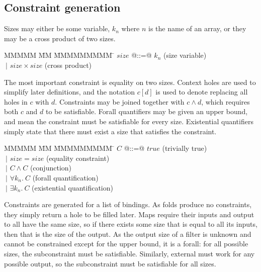 \newcommand{\constr}[1]{\llbracket #1 \rrbracket}
\newcommand{\hole}[0]{[]}
\newcommand{\fillhole}[2]{#1\left[#2\right]}


\subsection{Constraint generation}
Sizes may either be some variable, $k_n$ where $n$ is the name of an array, or they may be a cross product of two sizes.
\begin{tabbing}
MMMMM   \= MM \= MMMMMMMMM \= \kill
$size$  \> @::=@ \> $k_n$               \> (size variable) \\
        \> $~|$  \> $size \times size$  \> (cross product)
\end{tabbing}

The most important constraint is equality on two sizes.
Context holes are used to simplify later definitions, and the notation $\fillhole{c}{d}$ is used to denote replacing all holes in $c$ with $d$.
Constraints may be joined together with $c \wedge d$, which requires both $c$ and $d$ to be satisfiable.
Forall quantifiers may be given an upper bound, and mean the constraint must be satisfiable for every size.
Existential quantifiers simply state that there must exist a size that satisfies the constraint.
\begin{tabbing}
MMMMM   \= MM \= MMMMMMMMM \= \kill
$C$     \> @::=@ \> $true$              \> (trivially true)             \\
        \> $~|$  \> $size = size$       \> (equality constraint)        \\
        \> $~|$  \> $C \wedge C$        \> (conjunction)                \\
        \> $~|$  \> $\forall k_n.\ C$   \> (forall quantification)      \\
        \> $~|$  \> $\exists k_n.\ C$   \> (existential quantification)
\end{tabbing}

Constraints are generated for a list of bindings.
As folds produce no constraints, they simply return a hole to be filled later.
Maps require their inputs and output to all have the same size, so if there exists some size that is equal to all its inputs, then that is the size of the output.
As the output size of a filter is unknown and cannot be constrained except for the upper bound, it is a forall: for all possible sizes, the subconstraint must be satisfiable.
Similarly, external must work for any possible output, so the subconstraint must be satisfiable for all sizes.

